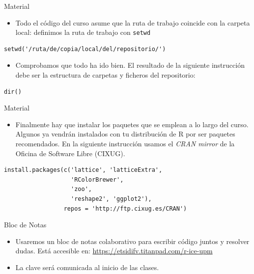 \documentclass[xcolor={usenames,svgnames,dvipsnames}]{beamer}
\begin{document}
\begin{frame}[fragile,label={sec:orgheadline4}]{Material}
 \begin{itemize}
\item Todo el código del curso asume que la ruta de trabajo coincide con la carpeta local: definimos la ruta de trabajo con \texttt{setwd}
\end{itemize}
\lstset{language=R,label= ,caption= ,captionpos=b,numbers=none}
\begin{lstlisting}
setwd('/ruta/de/copia/local/del/repositorio/')
\end{lstlisting}

\begin{itemize}
\item Comprobamos que todo ha ido bien. El resultado de la siguiente instrucción debe ser la estructura de carpetas y ficheros del repositorio:
\end{itemize}
\lstset{language=R,label= ,caption= ,captionpos=b,numbers=none}
\begin{lstlisting}
dir()
\end{lstlisting}
\end{frame}

\begin{frame}[fragile,label={sec:orgheadline5}]{Material}
 \begin{itemize}
\item Finalmente hay que instalar los paquetes que se emplean a lo largo del curso. Algunos ya vendrán instalados con tu distribución de R por ser paquetes recomendados. En la siguiente instrucción usamos el \emph{CRAN mirror} de la Oficina de Software Libre (CIXUG).
\end{itemize}
\lstset{language=R,label= ,caption= ,captionpos=b,numbers=none}
\begin{lstlisting}
install.packages(c('lattice', 'latticeExtra',
                   'RColorBrewer',
                   'zoo',
                   'reshape2', 'ggplot2'),
                 repos = 'http://ftp.cixug.es/CRAN')
\end{lstlisting}
\end{frame}

\begin{frame}[label={sec:orgheadline6}]{Bloc de Notas}
\begin{itemize}
\item Usaremos un bloc de notas colaborativo para escribir código juntos y resolver dudas. Está accesible en: \url{https://etsidifv.titanpad.com/r-ice-upm}

\item La clave será comunicada al inicio de las clases.
\end{itemize}
\end{frame}
\end{document}
